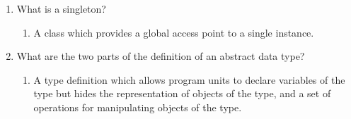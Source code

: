 \begin{enumerate}
\begin{answer}
\begin{enumerate}
    \end{enumerate}

    \end{answer}
  \item What is a singleton?

  
    \begin{answer}

    \begin{enumerate}
    \item A class which provides a global access point to a single instance.  
    \end{enumerate}

    \end{answer}

  \item What are the two parts of the definition 
    of an abstract data type?

    \begin{answer}

    \begin{enumerate}
    \item A type definition which allows program units to declare variables of the 
type but hides the representation of objects of the type, and a set of operations 
for manipulating objects of the type.
 
    \end{enumerate}

    \end{answer}

  \end{enumerate}



